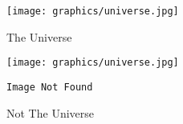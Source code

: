 \documentclass[10pt]{extarticle}
\date{}
\begin{document}

\begin{figure}[h!]
\centering
\texttt{[image: graphics/universe.jpg]}
\caption{The Universe}\end{figure}

\begin{figure}[h!]
\centering
\texttt{[image: graphics/universe.jpg]}
\end{figure}

\begin{figure}[h!]
\centering
\texttt{Image Not Found}
\caption{Not The Universe}\end{figure}

\end{document}

